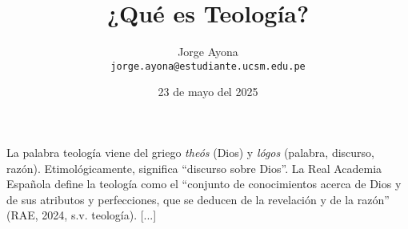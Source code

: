 \documentclass[12pt]{article}
\title{¿Qué es Teología?}
\author{Jorge Ayona\\\texttt{jorge.ayona@estudiante.ucsm.edu.pe}}
\date{23 de mayo del 2025}
\begin{document}
\maketitle
\onehalfspacing  %

La palabra teología viene del griego \textit{theós} (Dios) y \textit{lógos} (palabra, discurso, razón). Etimológicamente, significa “discurso sobre Dios”. La Real Academia Española define la teología como el “conjunto de conocimientos acerca de Dios y de sus atributos y perfecciones, que se deducen de la revelación y de la razón” (RAE, 2024, s.v. teología). [...]

\printbibliography
\end{document}
